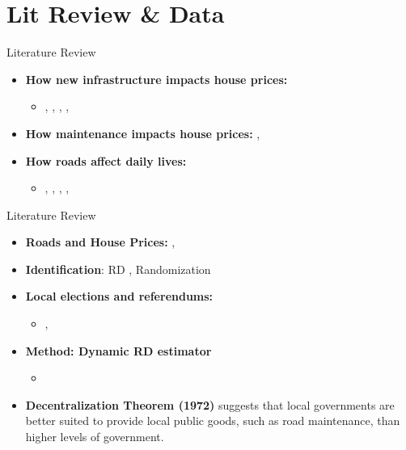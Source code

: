 \documentclass{beamer}
\begin{document}
\section{Lit Review \& Data}

\begin{frame}[label=lit1]{Literature Review}
    \begin{itemize}
        \item \textbf{How new infrastructure impacts house prices:} 
        \begin{itemize}
            \item \cite{hoogendoorn2019house}, \cite{li2016wheels}, \cite{gibbons2005valuing}, \cite{levkovich2016effects}, \cite{beenstock2016hedonic}
        \end{itemize}
        \vskip 0.5cm
        \item \textbf{How maintenance impacts house prices:} \cite{edel1974taxes}, \cite{rioja2003}
        \vskip 0.5cm
        \item \textbf{How roads affect daily lives:} 
        \begin{itemize}
            \item \cite{currier2023}, \cite{asher2020}, \cite{adukia2020}, \cite{gibbons2019new}, \cite{hettige2006}
        \end{itemize}        
        \vskip 1cm
        \begin{flushright}
            \hyperlink{gdp_and_roads}{}
        \end{flushright}        
    \end{itemize}
\end{frame}

\begin{frame}{Literature Review}
    \begin{itemize}
        \item {\bf Roads and House Prices:} \cite{gonzalez2016paving}, \cite{chaurey2022}
        \item \textbf{Identification}: RD \citep{cellini2010value,asher2020}, Randomization \citep{gonzalez2016paving} 
        \item \textbf{Local elections and referendums:} 
        \begin{itemize}
            \item \cite{cellini2010value}, \cite{biasi_what_2025}
        \end{itemize}
        \item \textbf{Method: Dynamic RD estimator}
        \begin{itemize}
            \item \cite{cellini2010value}
        \end{itemize}
        \item {\bf \citeauthor{Oates1972} Decentralization Theorem (1972)} suggests that local governments are better suited to provide local public goods, such as road maintenance, than higher levels of government.
    \end{itemize}
\end{frame}
\end{document}
